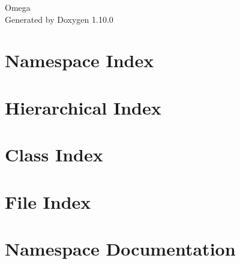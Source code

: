 \documentclass[twoside]{book}
\newcommand{\+}{\discretionary{\mbox{\scriptsize$\hookleftarrow$}}{}{}}
\newcommand{\clearemptydoublepage}{%
    \newpage{\pagestyle{empty}\cleardoublepage}%
  }
\begin{document}
  \raggedbottom
    \hypersetup{pageanchor=false,
                bookmarksnumbered=true,
                pdfencoding=unicode
               }
  \begin{titlepage}
  \vspace*{7cm}
  \begin{center}%
  {\Large Omega}\\
  \vspace*{1cm}
  {\large Generated by Doxygen 1.10.0}\\
  \end{center}
  \end{titlepage}
  \clearemptydoublepage
  \tableofcontents
  \clearemptydoublepage
  \hypersetup{pageanchor=true}




\chapter{Namespace Index}

\chapter{Hierarchical Index}

\chapter{Class Index}

\chapter{File Index}

\chapter{Namespace Documentation}









\end{document}
